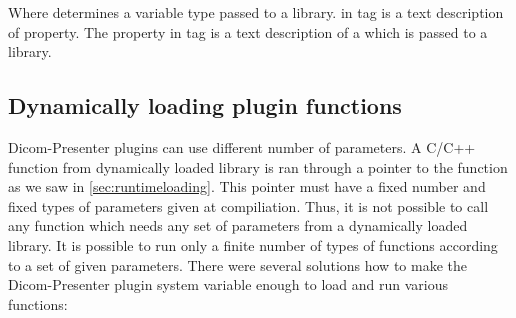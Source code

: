 Where  determines a variable type passed to a library.  in  tag is a text description of property. The  property in  tag is a text description of a  which is passed to a library.


\begin{comment}
First idea was to use our own way to describe plugin GUI. The first version of plugins system used it's own primitive language. Lines in description file were corresponding to GUI elements. First word of a line determined a type of an element. Other words on the line described element behaviour such as default value, minimum and maximum value or a corresponding function in a library. This own language of GUI description was sufficient but it was unnecessary to force plugin programmer to use our own language. Instead it would be better to use some existing standard.

Other way how to describe a plugin GUI was to use XML language. XML is often use in computer science to pass information in an easily processable form. Moreover Qt library includes extended tools for XML processing.

Last option is to use Qt language for UI description. Qt library uses it's own form to describe application GUI - description is in a special file with a \clist{.ui} extension. It is a strong argument for this option that it is a native way for Qt library to use this langage. Qt library provides a utility for interactive GUI creating. 
\end{comment}



\subsection*{Dynamically loading plugin functions}

Dicom-Presenter plugins can use different number of parameters. A C/C++ function from dynamically loaded library is ran through a pointer to the function as we saw in \ref{sec:runtimeloading}. This pointer must have a fixed number and fixed types of parameters given at compiliation. Thus, it is not possible to call any function which needs any set of parameters from a dynamically loaded library. It is possible to run only a finite number of types of functions according to a set of given parameters. There were several solutions how to make the Dicom-Presenter plugin system variable enough to load and run various functions:

